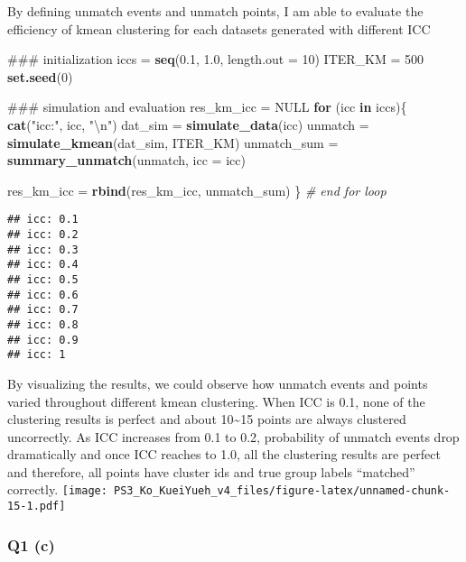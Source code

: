\documentclass[]{article}
\newenvironment{Shaded}{\begin{snugshade}}{\end{snugshade}}
\newcommand{\KeywordTok}[1]{\textcolor[rgb]{0.13,0.29,0.53}{\textbf{#1}}}
\newcommand{\DataTypeTok}[1]{\textcolor[rgb]{0.13,0.29,0.53}{#1}}
\newcommand{\DecValTok}[1]{\textcolor[rgb]{0.00,0.00,0.81}{#1}}
\newcommand{\FloatTok}[1]{\textcolor[rgb]{0.00,0.00,0.81}{#1}}
\newcommand{\CharTok}[1]{\textcolor[rgb]{0.31,0.60,0.02}{#1}}
\newcommand{\StringTok}[1]{\textcolor[rgb]{0.31,0.60,0.02}{#1}}
\newcommand{\CommentTok}[1]{\textcolor[rgb]{0.56,0.35,0.01}{\textit{#1}}}
\newcommand{\OtherTok}[1]{\textcolor[rgb]{0.56,0.35,0.01}{#1}}
\newcommand{\ControlFlowTok}[1]{\textcolor[rgb]{0.13,0.29,0.53}{\textbf{#1}}}
\newcommand{\NormalTok}[1]{#1}
\begin{document}
By defining unmatch events and unmatch points, I am able to evaluate the
efficiency of kmean clustering for each datasets generated with
different ICC

\begin{Shaded}
\begin{Highlighting}[]
\NormalTok{### initialization}
\NormalTok{iccs =}\StringTok{ }\KeywordTok{seq}\NormalTok{(}\FloatTok{0.1}\NormalTok{, }\FloatTok{1.0}\NormalTok{, }\DataTypeTok{length.out =} \DecValTok{10}\NormalTok{)}
\NormalTok{ITER_KM =}\StringTok{ }\DecValTok{500}
\KeywordTok{set.seed}\NormalTok{(}\DecValTok{0}\NormalTok{)}

\NormalTok{### simulation and evaluation}
\NormalTok{res_km_icc =}\StringTok{ }\OtherTok{NULL}
\ControlFlowTok{for}\NormalTok{ (icc }\ControlFlowTok{in}\NormalTok{ iccs)\{}
    \KeywordTok{cat}\NormalTok{(}\StringTok{"icc:"}\NormalTok{, icc, }\StringTok{"}\CharTok{\textbackslash{}n}\StringTok{"}\NormalTok{)}
\NormalTok{    dat_sim =}\StringTok{ }\KeywordTok{simulate_data}\NormalTok{(icc)}
\NormalTok{    unmatch =}\StringTok{ }\KeywordTok{simulate_kmean}\NormalTok{(dat_sim, ITER_KM)}
\NormalTok{    unmatch_sum =}\StringTok{ }\KeywordTok{summary_unmatch}\NormalTok{(unmatch, }\DataTypeTok{icc =}\NormalTok{ icc)}
    
\NormalTok{    res_km_icc =}\StringTok{ }\KeywordTok{rbind}\NormalTok{(res_km_icc, unmatch_sum)}
\NormalTok{\} }\CommentTok{# end for loop}
\end{Highlighting}
\end{Shaded}

\begin{verbatim}
## icc: 0.1 
## icc: 0.2 
## icc: 0.3 
## icc: 0.4 
## icc: 0.5 
## icc: 0.6 
## icc: 0.7 
## icc: 0.8 
## icc: 0.9 
## icc: 1
\end{verbatim}

By visualizing the results, we could observe how unmatch events and
points varied throughout different kmean clustering. When ICC is 0.1,
none of the clustering results is perfect and about
10\textasciitilde{}15 points are always clustered uncorrectly. As ICC
increases from 0.1 to 0.2, probability of unmatch events drop
dramatically and once ICC reaches to 1.0, all the clustering results are
perfect and therefore, all points have cluster ids and true group labels
``matched'' correctly.
\texttt{[image: PS3\_Ko\_KueiYueh\_v4\_files/figure-latex/unnamed-chunk-15-1.pdf]}

\subsubsection{Q1 (c)}\label{q1-c}
\end{document}
